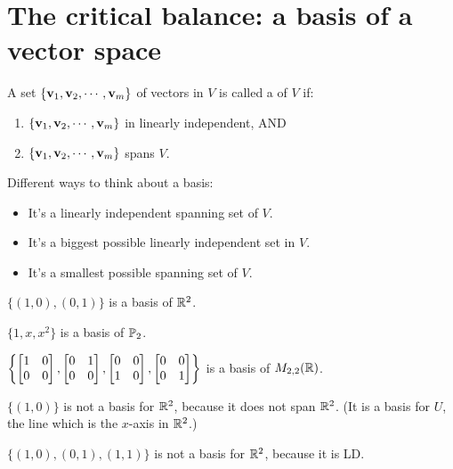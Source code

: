 \section{The critical balance:  a basis of a vector space}



\begin{definition}
A set $\{\mathbf{v}_1,\mathbf{v}_2, \cdots, \mathbf{v}_m\}$ of vectors in $V$ is
called a  of $V$ if:
\begin{enumerate}
\item $\{\mathbf{v}_1,\mathbf{v}_2, \cdots, \mathbf{v}_m\}$ in linearly independent, AND
\item $\{\mathbf{v}_1,\mathbf{v}_2, \cdots, \mathbf{v}_m\}$ spans $V$.
\end{enumerate}
\end{definition}

Different ways to think about a basis:
\begin{itemize}
\item It's a linearly independent spanning set of $V$.
\item It's a biggest possible linearly independent set in $V$.
\item It's a smallest possible spanning set of $V$.
\end{itemize}
 
\begin{myexample} $\{(1,0), (0,1)\}$ is a basis of $\mathbb{R}^2$. \end{myexample}

\begin{myexample} $\{1,x,x^2\}$ is a basis of $\mathbb{P}_2$. \end{myexample}

\begin{myexample} $\left\{ \left[ \begin{matrix} 1&0\\0&0 \end{matrix} \right],  \left[ \begin{matrix} 0&1\\0&0 \end{matrix} \right],  \left[ \begin{matrix} 0&0\\1&0 \end{matrix} \right],  \left[ \begin{matrix} 0&0\\0&1 \end{matrix} \right]\right\}$ is a basis of $M_{2,2}(\mathbb{R})$. \end{myexample}

\begin{myexample} $\{(1,0)\}$ is not a basis for $\mathbb{R}^2$, because it does not span $\mathbb{R}^2$.  (It is a basis for $U$,
the line which is the $x$-axis in $\mathbb{R}^2$.) \end{myexample}

\begin{myexample} $\{(1,0), (0,1), (1,1)\}$ is not a basis for $\mathbb{R}^2$, because
it is LD. \end{myexample}

